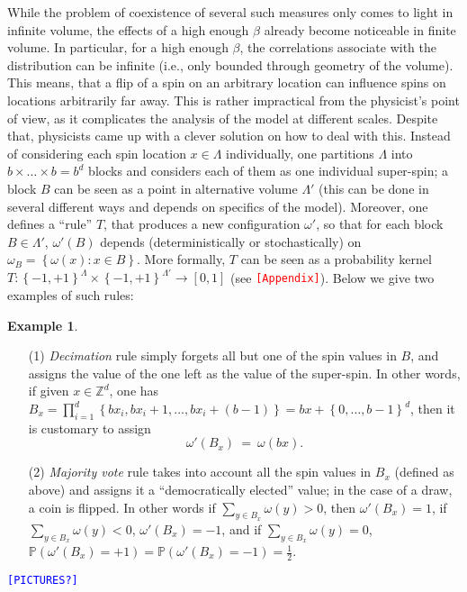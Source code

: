 \documentclass[12pt]{article}
\renewcommand{\P}{\mathbb{P}}
\newcommand{\Z}{\mathbb{Z}}
\newcommand{\set}[1]{\left\{#1\right\}}
\newcommand{\ra}{\rightarrow}
\newcommand{\1}{\mathbbm{1}}
\newcommand{\5}{\vspace{0.5cm}}
\theoremstyle{definition}
\newtheorem{ex}[thm]{Example}
\begin{document}
While the problem of coexistence of several such measures only comes to light in infinite volume, the effects of a high enough $\beta$ already become noticeable in finite volume. In particular, for a high enough $\beta$, the correlations associate with the distribution can be infinite (i.e., only bounded through geometry of the volume). This means, that a flip of a spin on an arbitrary location can influence spins on locations arbitrarily far away. This is rather impractical from the physicist's point of view, as it complicates the analysis of the model at different scales. Despite that, physicists came up with a clever solution on how to deal with this. Instead of considering each spin location $x\in\Lambda$ individually, one partitions $\Lambda$ into $b\times\ldots\times b=b^d$ blocks and considers each of them as one individual super-spin; a block $B$ can be seen as a point in alternative volume $\Lambda'$ (this can be done in several different ways and depends on specifics of the model). Moreover, one defines a ``rule'' $T$, that produces a new configuration $\omega'$, so that for each block $B\in\Lambda'$, $\omega'(B)$ depends (deterministically or stochastically) on $\omega_B=\set{\omega(x):x\in B}$. More formally, $T$ can be seen as a probability kernel $T:\set{-1,+1}^{\Lambda}\times\set{-1,+1}^{\Lambda'}\ra[0,1]$ (see \textcolor{red}{\texttt{[Appendix]}}). Below we give two examples of such rules:

\begin{ex}
~
\begin{itemize}
	\item[(1)] \textit{Decimation} rule simply forgets all but one of the spin values in $B$, and assigns the value of the one left as the value of the super-spin. In other words, if given $x\in\Z^d$, one has $B_x=\prod_{i=1}^d \set{b x_i,b x_i+1,\ldots,b x_i+(b-1)}=bx+\set{0,\ldots,b-1}^d$, then it is customary to assign
	$$\omega'(B_x) ~=~ \omega(bx).$$
	\item[(2)] \textit{Majority vote} rule takes into account all the spin values in $B_x$ (defined as above) and assigns it a ``democratically elected'' value; in the case of a draw, a coin is flipped. In other words if $\sum_{y\in B_x}\omega(y)>0$, then $\omega'(B_x)=1$, if $\sum_{y\in B_x}\omega(y)<0$, $\omega'(B_x)=-1$, and if $\sum_{y\in B_x}\omega(y)=0$, $\P(\omega'(B_x)=+1)=\P(\omega'(B_x)=-1)=\frac{1}{2}$.
\end{itemize}
\end{ex}

\textcolor{blue}{\texttt{[PICTURES?]}} \\
\end{document}
